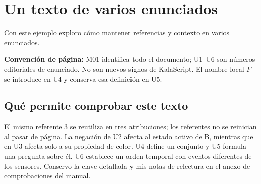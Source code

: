 \section{Un texto de varios enunciados}\label{sec:texto-integrado}

Con este ejemplo exploro cómo mantener referencias y contexto en varios enunciados.
\par\KalaContextoTexto
\par\textbf{Convención de página:} M01 identifica todo el documento; U1--U6
son números editoriales de enunciado. No son nuevos signos de KalaScript.
El nombre local \(F\) se introduce en U4 y conserva esa definición en U5.

\clearpage
{}

\subsection{Qué permite comprobar este texto}
El mismo referente 3 se reutiliza en tres atribuciones; los referentes no se
reinician al pasar de página. La negación de U2 afecta al estado activo de B,
mientras que en U3 afecta solo a su propiedad de color. U4 define un conjunto
y U5 formula una pregunta sobre él. U6 establece un orden temporal con eventos
diferentes de los sensores. Conservo la clave detallada y mis notas de
relectura en el anexo de comprobaciones del manual.
